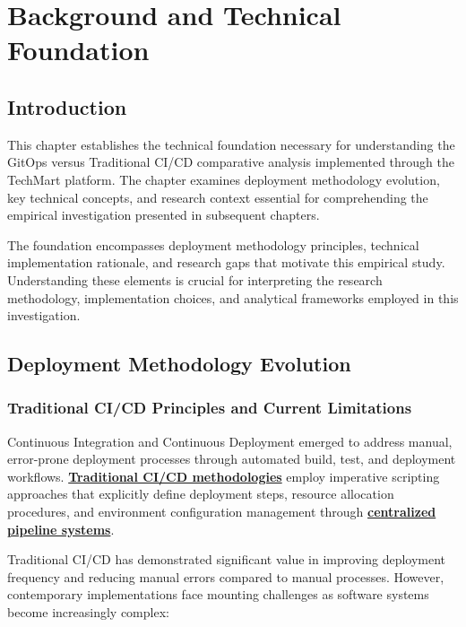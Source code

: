 \chapter{Background and Technical Foundation}

\section{Introduction}

This chapter establishes the technical foundation necessary for understanding the GitOps versus Traditional CI/CD comparative analysis implemented through the TechMart platform. The chapter examines deployment methodology evolution, key technical concepts, and research context essential for comprehending the empirical investigation presented in subsequent chapters.

The foundation encompasses deployment methodology principles, technical implementation rationale, and research gaps that motivate this empirical study. Understanding these elements is crucial for interpreting the research methodology, implementation choices, and analytical frameworks employed in this investigation.

\section{Deployment Methodology Evolution}

\subsection{Traditional CI/CD Principles and Current Limitations}

Continuous Integration and Continuous Deployment emerged to address manual, error-prone deployment processes through automated build, test, and deployment workflows. \textbf{\hyperref[fowler2013continuous]{Traditional CI/CD methodologies}} employ imperative scripting approaches that explicitly define deployment steps, resource allocation procedures, and environment configuration management through \textbf{\hyperref[kim2016devops]{centralized pipeline systems}}.

Traditional CI/CD has demonstrated significant value in improving deployment frequency and reducing manual errors compared to manual processes. However, contemporary implementations face mounting challenges as software systems become increasingly complex:

